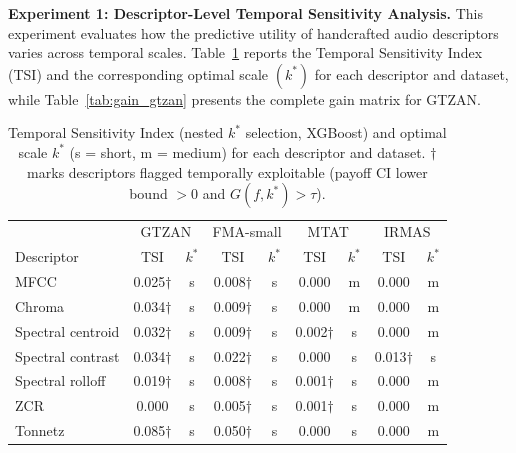 \documentclass[runningheads]{llncs}
\begin{document}
\textbf{Experiment 1: Descriptor-Level Temporal Sensitivity Analysis.}
This experiment evaluates how the predictive utility of handcrafted audio descriptors varies across temporal scales. Table~\ref{tab:tsi_summary} reports the Temporal Sensitivity Index (TSI) and the corresponding optimal scale $(k^*)$ for each descriptor and dataset, while Table~\ref{tab:gain_gtzan} presents the complete gain matrix for GTZAN.

\begin{table}[!htp]
\centering
{
\caption{Temporal Sensitivity Index (nested $k^*$ selection, XGBoost) and optimal scale $k^*$ (s = short, m = medium) for each descriptor and dataset. $\dagger$ marks descriptors flagged temporally exploitable (payoff CI lower bound $>0$ and $G(f,k^*)>\tau$).}
\label{tab:tsi_summary}
\begin{tabular}{|l|cc|cc|cc|cc|}
\hline
 & \multicolumn{2}{c|}{GTZAN} & \multicolumn{2}{c|}{FMA-small} & \multicolumn{2}{c|}{MTAT} & \multicolumn{2}{c|}{IRMAS} \\
Descriptor & TSI & $k^*$ & TSI & $k^*$ & TSI & $k^*$ & TSI & $k^*$ \\
\hline
MFCC              & 0.025$\dagger$ & s & 0.008$\dagger$ & s & 0.000          & m & 0.000          & m \\
Chroma            & 0.034$\dagger$ & s & 0.009$\dagger$ & s & 0.000          & m & 0.000          & m \\
Spectral centroid & 0.032$\dagger$ & s & 0.009$\dagger$ & s & 0.002$\dagger$ & s & 0.000          & m \\
Spectral contrast & 0.034$\dagger$ & s & 0.022$\dagger$ & s & 0.000          & s & 0.013$\dagger$ & s \\
Spectral rolloff  & 0.019$\dagger$ & s & 0.008$\dagger$ & s & 0.001$\dagger$ & s & 0.000          & m \\
ZCR               & 0.000          & s & 0.005$\dagger$ & s & 0.001$\dagger$ & s & 0.000          & m \\
Tonnetz           & 0.085$\dagger$ & s & 0.050$\dagger$ & s & 0.000          & s & 0.000          & m \\
\hline
\end{tabular}}
\end{table}
\end{document}

